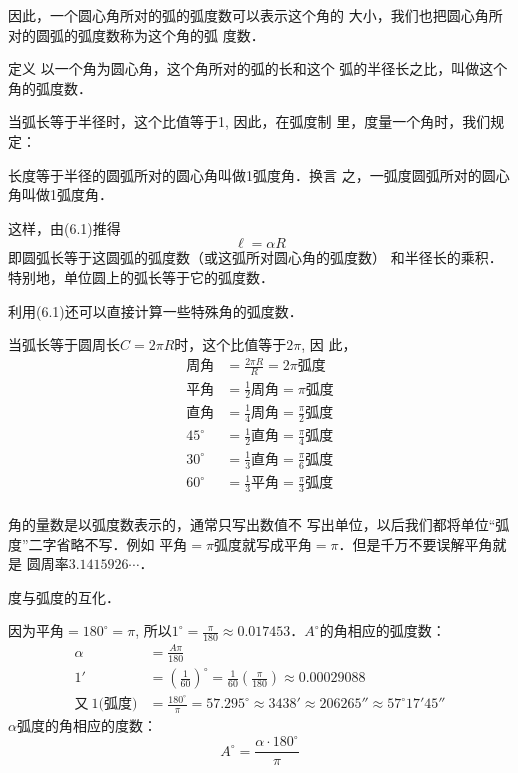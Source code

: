 因此，一个圆心角所对的弧的弧度数可以表示这个角的
大小，我们也把圆心角所对的圆弧的弧度数称为这个角的弧
度数．

\begin{blk}{定义}
    以一个角为圆心角，这个角所对的弧的长和这个
弧的半径长之比，叫做这个角的弧度数．
\end{blk}

当弧长等于半径时，这个比值等于1, 因此，在弧度制
里，度量一个角时，我们规定：

长度等于半径的圆弧所对的圆心角叫做1弧度角．换言
之，一弧度圆弧所对的圆心角叫做1弧度角．

这样，由(6.1)推得
\begin{equation}
    \ell=\alpha R
\end{equation}
即圆弧长等于这圆弧的弧度数（或这弧所对圆心角的弧度数）
和半径长的乘积．特别地，单位圆上的弧长等于它的弧度数．

利用(6.1)还可以直接计算一些特殊角的弧度数．

当弧长等于圆周长$C=2\pi R$时，这个比值等于$2\pi$, 因
此，
\[\begin{split}
    \text{周角}&=  \frac{2\pi R}{R}=2\pi \text{弧度}\\
    \text{平角}&=\frac{1}{2} \text{周角}=\pi \text{弧度}\\
    \text{直角}&=\frac{1}{4}\text{周角}=\frac{\pi}{2}\text{弧度}\\
    45^{\circ}&=\frac{1}{2}\text{直角}=\frac{\pi}{4}\text{弧度}\\
    30^{\circ}&=\frac{1}{3}\text{直角}=\frac{\pi}{6}\text{弧度}\\
    60^{\circ}&=\frac{1}{3}\text{平角}=\frac{\pi}{3}\text{弧度}\\
\end{split}\]

\begin{rmk}
角的量数是以弧度数表示的，通常只写出数值不
写出单位，以后我们都将单位“弧度”二字省略不写．例如
平角$=\pi$弧度就写成平角$=\pi$．但是千万不要误解平角就是
圆周率$3.1415926\cdots$．
\end{rmk}

度与弧度的互化．

因为平角$=180^{\circ}=\pi$, 所以$1^{\circ}=\frac{\pi}{180}
\approx 0.017453$．$A^{\circ}$的角相应的弧度数：
\[\begin{split}
    \alpha&=\frac{A\pi}{180}\\
    1'&=\left(\frac{1}{60}\right)^{\circ}=\frac{1}{60}\left(\frac{\pi}{180}\right)\approx 0.00029088\\
    \text{又}\ 1\text{(弧度)}&=\frac{180^{\circ}}{\pi}=57.295^{\circ}\approx 3438'\approx 206265''
    \approx 57^{\circ}17'45''
\end{split}\]
$\alpha$弧度的角相应的度数：
\[A^{\circ}=\frac{\alpha\cdot 180^{\circ}}{\pi}\]

